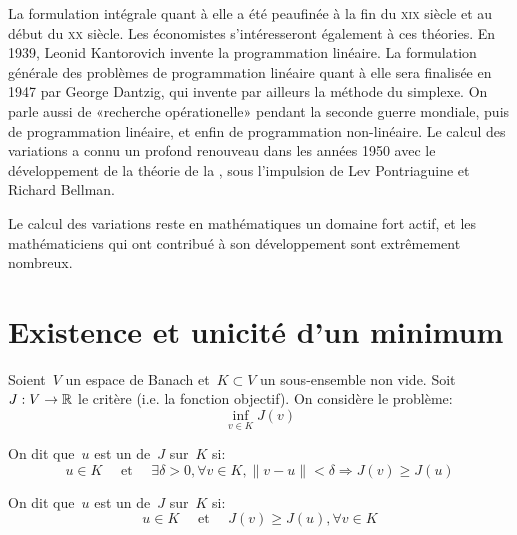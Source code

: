 \begin{histoire}
\medskip
La formulation intégrale quant à elle a été peaufinée à la fin du \textsc{xix} siècle et au début du \textsc{xx} siècle.
Les économistes s'intéresseront également à ces théories.
En 1939, Leonid Kantorovich invente la programmation linéaire. La formulation générale des problèmes de programmation linéaire quant à elle sera finalisée en 1947 par George Dantzig, qui invente par ailleurs la méthode du simplexe. On parle aussi de «recherche opérationelle» pendant la seconde guerre mondiale, puis de programmation linéaire, et enfin de programmation non-linéaire.
Le calcul des variations a connu un profond renouveau dans les années 1950 avec le développement de la théorie de la , sous l'impulsion de Lev Pontriaguine et Richard Bellman. 

Le calcul des variations reste en mathématiques un domaine fort actif, et les mathématiciens qui ont contribué à son développement sont extrêmement nombreux.
\end{histoire}

\ifVersionDuDocEstVincent\newpage\else\medskip\fi
\section{Existence et unicité d'un minimum}
\begin{definition}[Minima]
Soient~$V$ un espace de Banach et~$K\subset V$ un sous-ensemble non vide. Soit~$J: V\rightarrow\mathbb R$ le critère (i.e. la fonction objectif). On considère le problème:
\begin{equation}
\inf_{v\in K} J(v)
\end{equation}

On dit que~$u$ est un  de~$J$ sur~$K$ si:
\begin{equation}
u\in K \quad\text{ et }\quad \exists\delta>0, \forall v\in K, 
\|v-u\|<\delta \Rightarrow J(v)\ge J(u)
\end{equation}

On dit que~$u$ est un  de~$J$ sur~$K$ si:
\begin{equation}
u\in K \quad\text{ et }\quad J(v)\ge J(u), \forall v\in K
\end{equation}
\end{definition}

